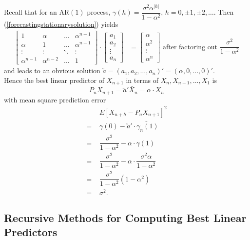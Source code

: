 \documentclass[11pt, a4paper]{article}
\numberwithin{equation}{section}
\theoremstyle{definition}
\begin{document}
Recall that for an AR$(1)$ process, $\gamma(h) = \dfrac{\sigma^2\alpha^{|h|}}{1-\alpha^2}, \, h = 0, \pm 1, \pm 2, \ldots$. Then (\ref{forecastingstationarysolution}) yields
\begin{align*}
\begin{bmatrix}
1 & \alpha & \ldots & \alpha^{n-1}\\
\alpha & 1 & \ldots & \alpha^{n-1}\\
\vdots & \vdots & \ddots & \vdots \\
\alpha^{n-1} & \alpha^{n-2} & \ldots & 1
\end{bmatrix}
\cdot
\begin{bmatrix}
a_1 \\ a_2 \\ \vdots \\ a_n
\end{bmatrix}
&=
\begin{bmatrix}
\alpha \\ \alpha^{2} \\ \vdots \\ \alpha^{n}
\end{bmatrix} \,\, \text{after factoring out } \dfrac{\sigma^2}{1 - \alpha^2}
\end{align*}
and leads to an obvious solution $\utilde{a} = (a_1, a_2, \ldots, a_n)' = (\alpha, 0, \ldots, 0)'$. \\[0.1em]

Hence the best linear predictor of $X_{n+1}$ in terms of $X_n, X_{n-1}, \ldots, X_1$ is $$P_n X_{n+1} = \utilde{a}'\utilde{X_n} = \alpha \cdot X_n$$
with mean square prediction error
\begin{align*}
&E\left[ X_{n+h} - P_n X_{n+1} \right]^2 \\[0.3em]
=\,\, &\gamma(0) - \utilde{a}' \cdot \utilde{\gamma_n(1)} \\[0.3em]
=\,\, &\dfrac{\sigma^2}{1 - \alpha^2} - \alpha \cdot \gamma(1) \\[0.3em]
=\,\, &\dfrac{\sigma^2}{1 - \alpha^2} - \alpha \cdot \dfrac{\sigma^2 \alpha}{1 - \alpha^2} \\[0.3em]
=\,\, &\dfrac{\sigma^2}{1 - \alpha^2} (1-\alpha^2) \\[0.3em]
=\,\, &\sigma^2.
\end{align*}

\subsection{Recursive Methods for Computing Best Linear Predictors}
\end{document}
